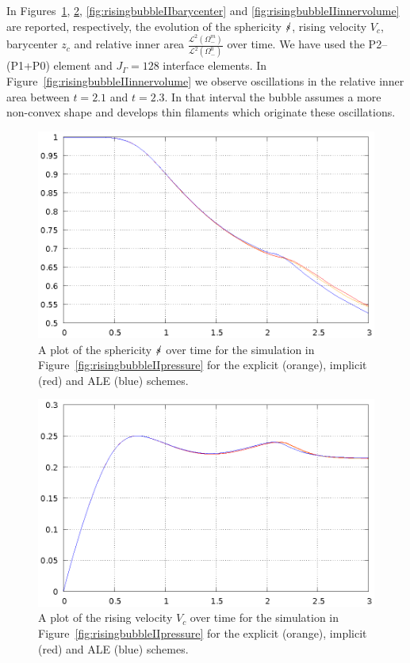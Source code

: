 In Figures~\ref{fig:risingbubbleIIsphericity},
\ref{fig:risingbubbleIIrisingvelocity}, \ref{fig:risingbubbleIIbarycenter} and
\ref{fig:risingbubbleIIinnervolume} are reported, respectively, the evolution of
the sphericity $\mbox{$s\!\!\!\!\:/$}$, rising velocity $V_c$, barycenter $z_c$ and relative
inner area $\frac{\mathcal{L}^2(\Omega^m_-)}{\mathcal{L}^2(\Omega^0_-)}$ over
time. We have used the P2--(P1+P0) element and $J_\Gamma=128$ interface
elements. In Figure~\ref{fig:risingbubbleIIinnervolume} we observe oscillations
in the relative inner area between $t=2.1$ and $t=2.3$. In that interval the
bubble assumes a more non-convex shape and develops thin filaments which
originate these oscillations.
\begin{figure}[htbp]
\centering
\includegraphics[width=.45\textwidth]
{figures/navier_stokes/rising_bubble_II_sphericity.ps}
\caption[Navier--Stokes rising bubble II sphericity]
{A plot of the sphericity $\mbox{$s\!\!\!\!\:/$}$ over time for the simulation in
Figure~\ref{fig:risingbubbleIIpressure} for the explicit (orange), implicit
(red) and ALE (blue) schemes.}
\label{fig:risingbubbleIIsphericity}
\end{figure}

\begin{figure}[htbp]
\centering
\includegraphics[width=.45\textwidth]
{figures/navier_stokes/rising_bubble_II_rising_velocity.ps}
\caption[Navier--Stokes rising bubble II rising velocity]
{A plot of the rising velocity $V_c$ over time for the simulation in
Figure~\ref{fig:risingbubbleIIpressure} for the explicit (orange), implicit
(red) and ALE (blue) schemes.}
\label{fig:risingbubbleIIrisingvelocity}
\end{figure}

